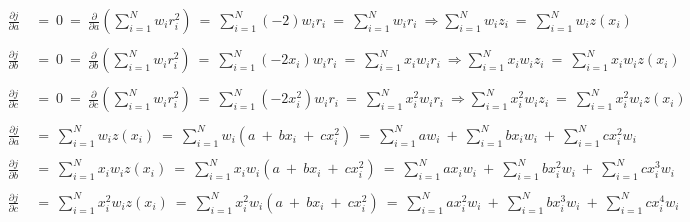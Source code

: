 \documentclass[12pt,runningheads]{article}
\begin{document}
\begin{align*}
\frac{\partial j}{\partial a}\ &=\ 0\ =\ \frac{\partial}{\partial a}(\sum_{i=1}^{N}w_{i}r_{i}^2)\ =\ \sum_{i=1}^{N}(-2)w_{i}r_{i}\ =\ \sum_{i=1}^{N}w_{i}r_{i}\ \Rightarrow \sum_{i=1}^{N}w_{i}z_{i}\ =\ \sum_{i=1}^{N}w_{i}z(x_{i})\\
\\
\frac{\partial j}{\partial b}\ &=\ 0\ =\ \frac{\partial}{\partial b}(\sum_{i=1}^{N}w_{i}r_{i}^2)\ =\ \sum_{i=1}^{N}(-2x_{i})w_{i}r_{i}\ =\ \sum_{i=1}^{N}x_{i}w_{i}r_{i}\ \Rightarrow \sum_{i=1}^{N}x_{i}w_{i}z_{i}\ =\ \sum_{i=1}^{N}x_{i}w_{i}z(x_{i})\\
\\
\frac{\partial j}{\partial c}\ &=\ 0\ =\ \frac{\partial}{\partial c}(\sum_{i=1}^{N}w_{i}r_{i}^2)\ =\ \sum_{i=1}^{N}(-2x_{i}^2)w_{i}r_{i}\ =\ \sum_{i=1}^{N}x_{i}^2w_{i}r_{i}\ \Rightarrow \sum_{i=1}^{N}x_{i}^2w_{i}z_{i}\ =\ \sum_{i=1}^{N}x_{i}^2w_{i}z(x_{i})\\
\\
\frac{\partial j}{\partial a}\ &=\ \sum_{i=1}^{N}w_{i}z(x_{i})\ =\ \sum_{i=1}^{N}w_{i}(a\ +\ bx_{i}\ +\ cx_{i}^2)\ =\ \sum_{i=1}^{N}aw_{i}\ + \ \sum_{i=1}^{N}bx_{i}w_{i}\ +\ \sum_{i=1}^{N}cx_{i}^2w_{i}\\
\\
\frac{\partial j}{\partial b}\ &=\ \sum_{i=1}^{N}x_{i}w_{i}z(x_{i})\ =\ \sum_{i=1}^{N}x_{i}w_{i}(a\ +\ bx_{i}\ +\ cx_{i}^2)\ =\ \sum_{i=1}^{N}ax_{i}w_{i}\ + \ \sum_{i=1}^{N}bx_{i}^2w_{i}\ +\ \sum_{i=1}^{N}cx_{i}^3w_{i}\\
\\
\frac{\partial j}{\partial c}\ &=\ \sum_{i=1}^{N}x_{i}^2w_{i}z(x_{i})\ =\ \sum_{i=1}^{N}x_{i}^2w_{i}(a\ +\ bx_{i}\ +\ cx_{i}^2)\ =\ \sum_{i=1}^{N}ax_{i}^2w_{i}\ + \ \sum_{i=1}^{N}bx_{i}^3w_{i}\ +\ \sum_{i=1}^{N}cx_{i}^4w_{i}\\
\end{align*}
\end{document}
